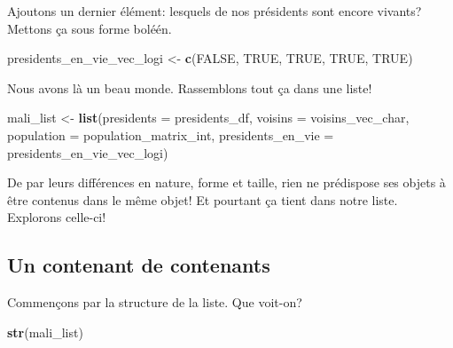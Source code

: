 \documentclass[]{book}
\newenvironment{Shaded}{\begin{snugshade}}{\end{snugshade}}
\newcommand{\KeywordTok}[1]{\textcolor[rgb]{0.13,0.29,0.53}{\textbf{#1}}}
\newcommand{\DataTypeTok}[1]{\textcolor[rgb]{0.13,0.29,0.53}{#1}}
\newcommand{\StringTok}[1]{\textcolor[rgb]{0.31,0.60,0.02}{#1}}
\newcommand{\OtherTok}[1]{\textcolor[rgb]{0.56,0.35,0.01}{#1}}
\newcommand{\NormalTok}[1]{#1}
\begin{document}
Ajoutons un dernier élément: lesquels de nos présidents sont encore
vivants? Mettons ça sous forme boléén.

\begin{Shaded}
\begin{Highlighting}[]
\NormalTok{presidents_en_vie_vec_logi <-}\StringTok{ }\KeywordTok{c}\NormalTok{(}\OtherTok{FALSE}\NormalTok{, }\OtherTok{TRUE}\NormalTok{, }\OtherTok{TRUE}\NormalTok{, }\OtherTok{TRUE}\NormalTok{, }\OtherTok{TRUE}\NormalTok{)}
\end{Highlighting}
\end{Shaded}

Nous avons là un beau monde. Rassemblons tout ça dans une liste!

\begin{Shaded}
\begin{Highlighting}[]
\NormalTok{mali_list <-}\StringTok{ }\KeywordTok{list}\NormalTok{(}\DataTypeTok{presidents =}\NormalTok{ presidents_df,}
                  \DataTypeTok{voisins =}\NormalTok{ voisins_vec_char,}
                  \DataTypeTok{population =}\NormalTok{ population_matrix_int,}
                  \DataTypeTok{presidents_en_vie =}\NormalTok{ presidents_en_vie_vec_logi)}
\end{Highlighting}
\end{Shaded}

De par leurs différences en nature, forme et taille, rien ne prédispose
ses objets à être contenus dans le même objet! Et pourtant ça tient dans
notre liste. Explorons celle-ci!

\subsection{Un contenant de
contenants}\label{un-contenant-de-contenants}

Commençons par la structure de la liste. Que voit-on?

\begin{Shaded}
\begin{Highlighting}[]
\KeywordTok{str}\NormalTok{(mali_list)}
\end{Highlighting}
\end{Shaded}
\end{document}
